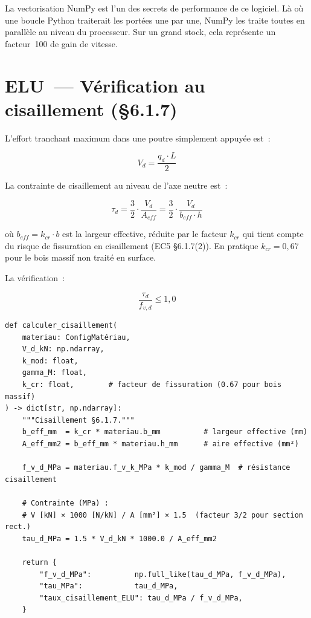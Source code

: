 \documentclass[12pt, a4paper, openany]{book}
\newcommand{\py}[1]{\texttt{#1}}
\newcommand{\fichier}[1]{\texttt{\textit{#1}}}
\begin{document}
\begin{important}
La vectorisation NumPy est l'un des secrets de performance de ce logiciel.
L\`a o\`u une boucle Python traiterait les port\'ees une par une,
NumPy les traite toutes en parall\`ele au niveau du processeur.
Sur un grand stock, cela repr\'esente un facteur~100 de gain de vitesse.
\end{important}

\section{ELU~--- V\'erification au cisaillement (\S{}6.1.7)}

L'effort tranchant maximum dans une poutre simplement appuy\'ee est~:

\begin{equation}
V_{d} = \frac{q_d \cdot L}{2}
\end{equation}

La contrainte de cisaillement au niveau de l'axe neutre est~:

\begin{equation}
\tau_d = \frac{3}{2} \cdot \frac{V_d}{A_{eff}} = \frac{3}{2} \cdot \frac{V_d}{b_{eff} \cdot h}
\label{eq:tau}
\end{equation}

o\`u $b_{eff} = k_{cr} \cdot b$ est la largeur effective, r\'eduite
par le facteur $k_{cr}$ qui tient compte du risque de fissuration
en cisaillement (EC5 \S{}6.1.7(2)).
En pratique $k_{cr} = 0{,}67$ pour le bois massif non trait\'e
en surface.

La v\'erification~:

\begin{equation}
\frac{\tau_d}{f_{v,d}} \leq 1{,}0
\end{equation}

\begin{lstlisting}[style=python, caption={\fichier{ec5/elu.py} --- fonction \py{calculer\_cisaillement()}}]
def calculer_cisaillement(
    materiau: ConfigMatériau,
    V_d_kN: np.ndarray,
    k_mod: float,
    gamma_M: float,
    k_cr: float,        # facteur de fissuration (0.67 pour bois massif)
) -> dict[str, np.ndarray]:
    """Cisaillement §6.1.7."""
    b_eff_mm  = k_cr * materiau.b_mm          # largeur effective (mm)
    A_eff_mm2 = b_eff_mm * materiau.h_mm      # aire effective (mm²)

    f_v_d_MPa = materiau.f_v_k_MPa * k_mod / gamma_M  # résistance cisaillement

    # Contrainte (MPa) :
    # V [kN] × 1000 [N/kN] / A [mm²] × 1.5  (facteur 3/2 pour section rect.)
    tau_d_MPa = 1.5 * V_d_kN * 1000.0 / A_eff_mm2

    return {
        "f_v_d_MPa":          np.full_like(tau_d_MPa, f_v_d_MPa),
        "tau_MPa":            tau_d_MPa,
        "taux_cisaillement_ELU": tau_d_MPa / f_v_d_MPa,
    }
\end{lstlisting}
\end{document}
